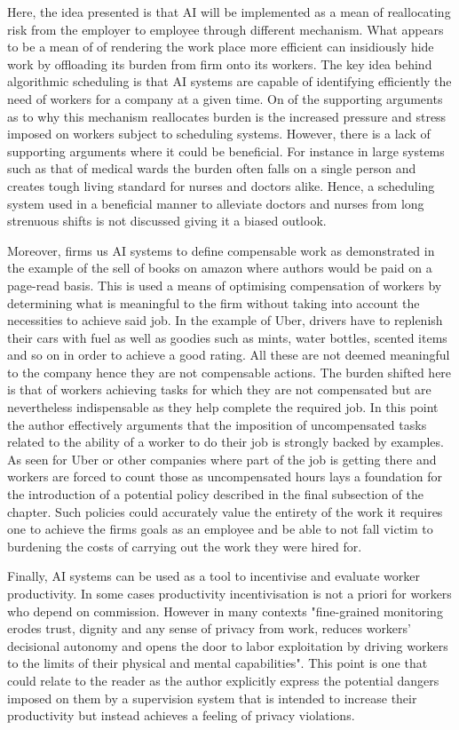 \documentclass[a4paper,11pt,oneside]{report}
\begin{document}
Here, the idea presented is that AI will be implemented as a mean of reallocating risk from the employer to employee through different mechanism. What appears to be a mean of of rendering the work place more efficient can insidiously hide work by offloading its burden from firm onto its workers. The key idea behind algorithmic scheduling is that AI systems are capable of identifying efficiently the need of workers for a company at a given time. On of the supporting arguments as to why this mechanism reallocates burden is the increased pressure and stress imposed on workers subject to scheduling systems. However, there is a lack of supporting arguments where it could be beneficial. For instance in large systems such as that of medical wards the burden often falls on a single person and creates tough living standard for nurses and doctors alike. Hence, a scheduling system used in a beneficial manner to alleviate doctors and nurses from long strenuous shifts is not discussed giving it a biased outlook.

Moreover, firms us AI systems to define compensable work as demonstrated in the example of the sell of books on amazon where authors would be paid on a page-read basis. This is used a means of optimising compensation of workers by determining what is meaningful to the firm without taking into account the necessities to achieve said job. In the example of Uber, drivers have to replenish their cars with fuel as well as goodies such as  mints, water bottles, scented items and so on in order to achieve a good rating. All these are not deemed meaningful to the company hence they are not compensable actions. The burden shifted here is that of workers achieving tasks for which they are not compensated but are nevertheless indispensable as they help complete the required job. In this point the author effectively arguments that the imposition of uncompensated tasks related to the ability of a worker to do their job is strongly backed by examples. As seen for Uber or other companies where part of the job is getting there and workers are forced to count those as uncompensated hours lays a foundation for the introduction of a potential policy described in the final subsection of the chapter. Such policies could accurately value the entirety of the work it requires one to achieve the firms goals as an employee and be able to not fall victim to burdening the costs of carrying out the work they were hired for.

Finally, AI systems can be used as a tool to incentivise and evaluate worker productivity. In some cases productivity incentivisation is not a priori for workers who depend on commission. However in many contexts "fine-grained monitoring erodes trust, dignity and any sense of privacy from work, reduces workers' decisional autonomy and opens the door to labor exploitation by driving workers to the limits of their physical and mental capabilities". This point is one that could relate to the reader as the author explicitly express the potential dangers imposed on them by a supervision system that is intended to increase their productivity but instead achieves a feeling of privacy violations.
\end{document}

